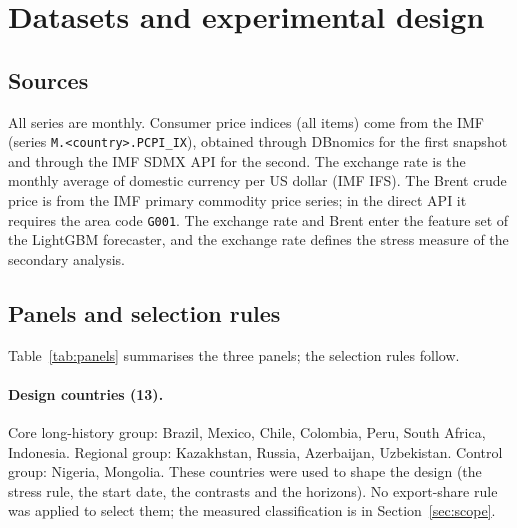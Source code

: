 \section{Datasets and experimental design}\label{sec:data}

\subsection{Sources}

All series are monthly. Consumer price indices (all items) come from the IMF (series \texttt{M.<country>.PCPI\_IX}), obtained through DBnomics for the first snapshot and through the IMF SDMX API for the second. The exchange rate is the monthly average of domestic currency per US dollar (IMF IFS). The Brent crude price is from the IMF primary commodity price series; in the direct API it requires the area code \texttt{G001}. The exchange rate and Brent enter the feature set of the LightGBM forecaster, and the exchange rate defines the stress measure of the secondary analysis.

\subsection{Panels and selection rules}\label{sec:panels}

Table~\ref{tab:panels} summarises the three panels; the selection rules follow.

\begin{table}[t]
\centering
\caption{The three country panels (design, first hold-out, second hold-out): CPI coverage, number of months and number of origins at $h=3$ per country.}
\label{tab:panels}
\small
\fittable{}
\end{table}

\paragraph{Design countries (13).} Core long-history group: Brazil, Mexico, Chile, Colombia, Peru, South Africa, Indonesia. Regional group: Kazakhstan, Russia, Azerbaijan, Uzbekistan. Control group: Nigeria, Mongolia. These countries were used to shape the design (the stress rule, the start date, the contrasts and the horizons). No export-share rule was applied to select them; the measured classification is in Section~\ref{sec:scope}.

